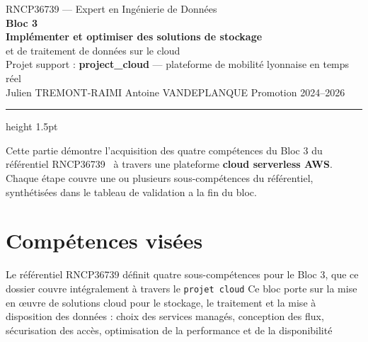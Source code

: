 \documentclass[11pt]{article}
\begin{document}
\thispagestyle{fancy}
\begin{center}
  \vspace*{0.3cm}
  {\small\textcolor{black!55}{RNCP36739 --- Expert en Ingénierie de Données}}\\[6pt]
  {\Huge\bfseries\textcolor{titleNavy}{Bloc 3}}\\[6pt]
  {\large\bfseries Implémenter et optimiser des solutions de stockage}\\[2pt]
  {\large et de traitement de données sur le cloud}\\[10pt]
  {\normalsize Projet support : \textbf{project\_cloud} --- plateforme de mobilité lyonnaise en temps réel}\\[4pt]
  {\small Julien TREMONT-RAIMI \quad\textbullet\quad Antoine VANDEPLANQUE \quad\textbullet\quad Promotion 2024--2026}
\end{center}

\vspace{4pt}
{\color{titleNavy}\hrule height 1.5pt}
\vspace{10pt}

Cette partie démontre l’acquisition des quatre compétences du Bloc 3 du référentiel
RNCP36739~\cite{rncp} à travers une plateforme \textbf{cloud serverless AWS}. Chaque 
étape couvre une ou plusieurs sous-compétences du référentiel, synthétisées dans le 
tableau de validation a la fin du bloc.


\section{Compétences visées}

Le référentiel RNCP36739 définit quatre sous-compétences pour le Bloc 3, que ce
dossier couvre intégralement à travers le \texttt{projet cloud}  Ce bloc porte sur 
la mise en œuvre de solutions cloud pour le stockage, le traitement et la mise à 
disposition des données : choix des services managés, conception des flux, sécurisation 
des accès, optimisation de la performance et de la disponibilité
\end{document}
